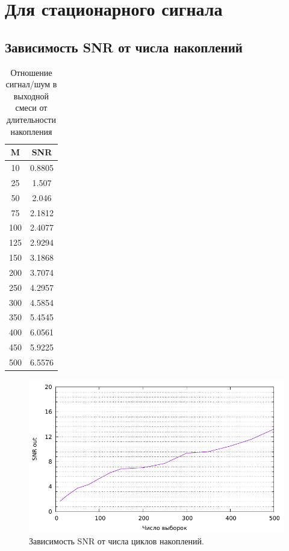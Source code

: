 \documentclass[12pt, a4paper] {ncc}
\begin{document}
\section{Для стационарного сигнала}
    
    \subsection{Зависимость SNR от числа накоплений}
        \begin{table}[H]
            \centering
            \begin{tabular} { |c|c| }
                \hline
                \textbf{M} & \textbf{SNR} \\ \hline
                    10     &  0.8805 \\ \hline
                    25     &  1.507 \\ \hline
                    50     &  2.046 \\ \hline
                    75     &  2.1812 \\ \hline
                    100    &  2.4077 \\ \hline
                    125    &  2.9294 \\ \hline
                    150    &  3.1868 \\ \hline
                    200    &  3.7074 \\ \hline
                    250    &  4.2957 \\ \hline
                    300    &  4.5854 \\ \hline
                    350    &  5.4545 \\ \hline
                    400    &  6.0561 \\ \hline
                    450    &  5.9225 \\ \hline
                    500    &  6.5576 \\ \hline
            \end{tabular}
            \caption{Отношение сигнал/шум в выходной смеси от длительности накопления}
        \end{table}

        \begin{figure}[H]
            \centering
            \includegraphics[scale=0.9,page=1]{stat_by_m.pdf}
            \caption{Зависимость SNR от числа циклов накоплений.}
        \end{figure}
\end{document}
